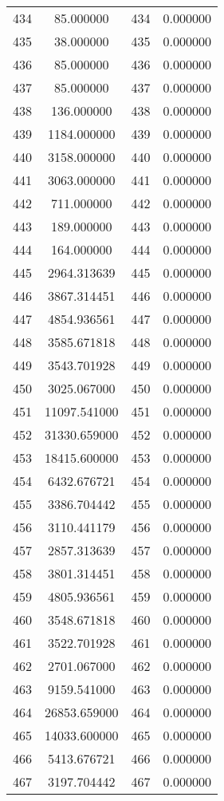 \documentclass[12pt]{article}
\begin{document}
\begin{longtable}{@{}cccc@{}}
434 & 85.000000 & 434 & 0.000000 \\
435 & 38.000000 & 435 & 0.000000 \\
436 & 85.000000 & 436 & 0.000000 \\
437 & 85.000000 & 437 & 0.000000 \\
438 & 136.000000 & 438 & 0.000000 \\
439 & 1184.000000 & 439 & 0.000000 \\
440 & 3158.000000 & 440 & 0.000000 \\
441 & 3063.000000 & 441 & 0.000000 \\
442 & 711.000000 & 442 & 0.000000 \\
443 & 189.000000 & 443 & 0.000000 \\
444 & 164.000000 & 444 & 0.000000 \\
445 & 2964.313639 & 445 & 0.000000 \\
446 & 3867.314451 & 446 & 0.000000 \\
447 & 4854.936561 & 447 & 0.000000 \\
448 & 3585.671818 & 448 & 0.000000 \\
449 & 3543.701928 & 449 & 0.000000 \\
450 & 3025.067000 & 450 & 0.000000 \\
451 & 11097.541000 & 451 & 0.000000 \\
452 & 31330.659000 & 452 & 0.000000 \\
453 & 18415.600000 & 453 & 0.000000 \\
454 & 6432.676721 & 454 & 0.000000 \\
455 & 3386.704442 & 455 & 0.000000 \\
456 & 3110.441179 & 456 & 0.000000 \\
457 & 2857.313639 & 457 & 0.000000 \\
458 & 3801.314451 & 458 & 0.000000 \\
459 & 4805.936561 & 459 & 0.000000 \\
460 & 3548.671818 & 460 & 0.000000 \\
461 & 3522.701928 & 461 & 0.000000 \\
462 & 2701.067000 & 462 & 0.000000 \\
463 & 9159.541000 & 463 & 0.000000 \\
464 & 26853.659000 & 464 & 0.000000 \\
465 & 14033.600000 & 465 & 0.000000 \\
466 & 5413.676721 & 466 & 0.000000 \\
467 & 3197.704442 & 467 & 0.000000 \\

\end{longtable}
\end{document}
